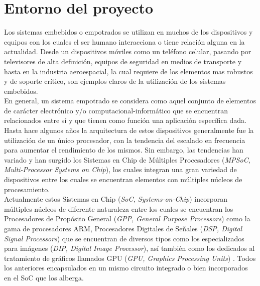 
\chapter{Entorno del proyecto}
\label{ch:Entorno_del_proyecto}

Los sistemas embebidos o empotrados se utilizan en muchos de los dispositivos
y equipos con los cuales el ser humano interacciona o tiene relación alguna en la actualidad. Desde un dispositivos
móviles como un teléfono celular, pasando por televisores de alta definición, equipos de seguridad
en medios de transporte y hasta en la industria aeroespacial, la cual requiere de los elementos mas robustos
y de soporte crítico, son ejemplos claros de la utilización de los sistemas embebidos.\\

En general, un sistema empotrado se considera como aquel conjunto de elementos de carácter electrónico y/o
computacional-informático que  se encuentran relacionados entre sí y que tienen como función una aplicación 
específica dada.\cite {LERTA} \cite{MK1} \\

Hasta hace algunos años la arquitectura de estos dispositivos generalmente fue la utilización de un único procesador, 
con la tendencia del escalado en frecuencia \cite{TAODES} para aumentar el rendimiento de los mismos. Sin embargo,
las tendencias han variado y han surgido los Sistemas en Chip de Múltiples Procesadores 
(\textit{MPSoC, Multi-Processor Systems on Chip}), los cuales integran una gran variedad de dispositivos entre los cuales
se encuentran elementos con múltiples núcleos de procesamiento.\\ 

Actualmente estos Sistemas en Chip (\textit{SoC, Systems-on-Chip}) incorporan 
múltiples núcleos de diferente naturaleza entre los cuales se encuentran los Procesadores de Propósito 
General (\textit{GPP, General Purpose Processors}) como la gama de procesadores ARM, Procesadores Digitales de 
Señales (\textit{DSP, Digital Signal Processors}) que se encuentran de diversos tipos como los 
especializados para imágenes (\textit{DIP, Digital Image Processor}), así también como los dedicados al tratamiento de gráficos llamados 
GPU (\textit{GPU, Graphics Processing Units}) \cite{MK2}. Todos los anteriores encapsulados en un mismo circuito integrado o bien 
incorporados en el SoC que los alberga.\\

